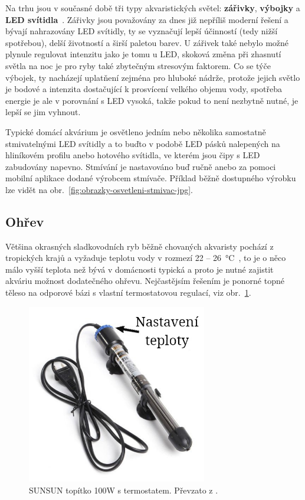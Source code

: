         Na trhu jsou v současné době tři typy akvaristických světel: \textbf{zářivky}, \textbf{výbojky}  a \textbf{LED svítidla}~\cite{eshop-rostlinna-akvaria-svetlo}. Zářivky jsou považovány za dnes již nepříliš moderní řešení a bývají nahrazovány LED svítidly, ty se vyznačují lepší účinností (tedy nižší spotřebou), delší životností a širší paletou barev. U zářivek také nebylo možné plynule regulovat intenzitu jako je tomu u LED, skoková změna při zhasnutí světla na noc je pro ryby také zbytečným stresovým faktorem. Co se týče výbojek, ty nacházejí uplatňení zejména pro hluboké nádrže, protože jejich světlo je bodové a intenzita dostačující k prosvícení velkého objemu vody, spotřeba energie je ale v porovnání s LED vysoká, takže pokud to není nezbytně nutné, je lepší se jim vyhnout.   

        Typické domácí akvárium je osvětleno jedním nebo několika samostatně stmivatelnými LED svítidly a to buďto v podobě LED pásků nalepených na hliníkovém profilu anebo hotového svítidla, ve kterém jsou čipy s LED zabudovány napevno. Stmívání je nastavováno buď ručně anebo za pomoci mobilní aplikace dodané výrobcem stmívače. Příklad běžně dostupného výrobku lze vidět na obr.~\ref{fig:obrazky-osvetleni-stmivac-jpg}.

    \subsection{Ohřev}
        Většina okrasných sladkovodních ryb běžně chovaných akvaristy pochází z tropických krajů a vyžaduje teplotu vody v rozmezí 22 -- \qty{26}{\degreeCelsius}~\cite{slavotinek2014}, to je o něco málo vyšší teplota než bývá v domácnosti typická a proto je nutné zajistit akváriu možnost dodatečného ohřevu. Nejčastějsím řešením je ponorné topné těleso na odporové bázi s vlastní termostatovou regulací, viz obr.~\ref{fig:obrazky-topeni-topitko-jpg}.

        \begin{figure}[h!]
            \centering
            \includegraphics[width=0.7\textwidth]{obrazky/topeni/topitko.jpg}
            \caption{SUNSUN topítko 100W s termostatem. Převzato z \cite{eshop-rostlinna-akvaria}.}
            \label{fig:obrazky-topeni-topitko-jpg}
        \end{figure}
        
